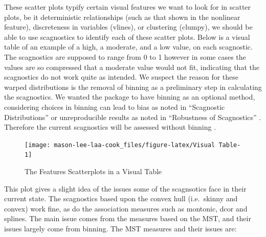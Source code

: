 These scatter plots typify certain visual features we want to look for
in scatter plots, be it deterministic relationships (such as that shown
in the nonlinear feature), discreteness in variables (vlines), or
clustering (clumpy), we should be able to use scagnostics to identify
each of these scatter plots. Below is a visual table of an example of a
high, a moderate, and a low value, on each scagnostic. The scagnostics
are supposed to range from 0 to 1 however in some cases the values are
so compressed that a moderate value would not fit, indicating that the
scagnostics do not work quite as intended. We suspect the reason for
these warped distributions is the removal of binning as a preliminary
step in calculating the scagnostics. We wanted the package to have
binning as an optional method, considering choices in binning can lead
to bias as noted in ``Scagnostic Distributions'' \citep{scagdist} or
unreproducible results as noted in ``Robustness of Scagnostics'' .
Therefore the current scagnostics will be assessed without binning
\citep{robust}.

\begin{Schunk}
\begin{figure}
\texttt{[image: mason-lee-laa-cook\_files/figure-latex/Visual Table-1]} \caption[The Features Scatterplots in a Visual Table]{The Features Scatterplots in a Visual Table}\label{fig:Visual Table}
\end{figure}
\end{Schunk}

This plot gives a slight idea of the issues some of the scagnsotics face
in their current state. The scagnostics based upon the convex hull
(i.e.~skinny and convex) work fine, as do the association measures such
as montonic, dcor and splines. The main issue comes from the measures
based on the MST, and their issues largely come from binning. The MST
measures and their issues are:

